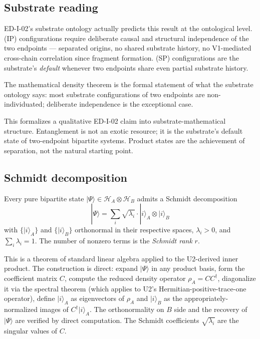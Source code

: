 \documentclass[11pt,a4paper]{article}
\begin{document}
\subsection{Substrate reading}

ED-I-02's substrate ontology actually predicts this result at the ontological level. (IP) configurations require deliberate causal and structural independence of the two endpoints --- separated origins, no shared substrate history, no V1-mediated cross-chain correlation since fragment formation. (SP) configurations are the substrate's \emph{default} whenever two endpoints share even partial substrate history.

The mathematical density theorem is the formal statement of what the substrate ontology says: most substrate configurations of two endpoints are non-individuated; deliberate independence is the exceptional case.

This formalizes a qualitative ED-I-02 claim into substrate-mathematical structure. Entanglement is not an exotic resource; it is the substrate's default state of two-endpoint bipartite systems. Product states are the achievement of separation, not the natural starting point.

\subsection{Schmidt decomposition}

Every pure bipartite state $|\Psi\rangle \in \mathcal{H}_A \otimes \mathcal{H}_B$ admits a Schmidt decomposition
\[
|\Psi\rangle = \sum_i \sqrt{\lambda_i} \cdot |i\rangle_A \otimes |i\rangle_B
\]
with $\{|i\rangle_A\}$ and $\{|i\rangle_B\}$ orthonormal in their respective spaces, $\lambda_i > 0$, and $\sum_i \lambda_i = 1$. The number of nonzero terms is the \emph{Schmidt rank} $r$.

This is a theorem of standard linear algebra applied to the U2-derived inner product. The construction is direct: expand $|\Psi\rangle$ in any product basis, form the coefficient matrix $C$, compute the reduced density operator $\rho_A = C C^\dagger$, diagonalize it via the spectral theorem (which applies to U2's Hermitian-positive-trace-one operator), define $|i\rangle_A$ as eigenvectors of $\rho_A$ and $|i\rangle_B$ as the appropriately-normalized images of $C^\dagger|i\rangle_A$. The orthonormality on $B$ side and the recovery of $|\Psi\rangle$ are verified by direct computation. The Schmidt coefficients $\sqrt{\lambda_i}$ are the singular values of $C$.
\end{document}
